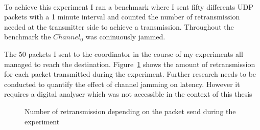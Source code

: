\paragraph{}

To achieve this experiment I ran a benchmark where I sent fifty differents UDP packets
with a 1 minute interval and counted the number of retransmission needed at
the transmitter side to achieve a transmission.
Throughout the benchmark the $Channel_0$ was coninuously jammed.

The 50 packets I sent to the coordinator in the course of my experiments
all managed to reach the destination.
Figure~\ref{fig:retransmission} shows the amount of retransmission for each
packet transmitted during the experiment.
Further research needs to be conducted to quantify the effect of channel
jamming on latency. However it requires a digital analyser which was not
accessible in the context of this thesis

\begin{figure}[H]
  \centering
  \caption{Number of retransmission depending on the packet send during the experiment\label{fig:retransmission}}
\end{figure}

